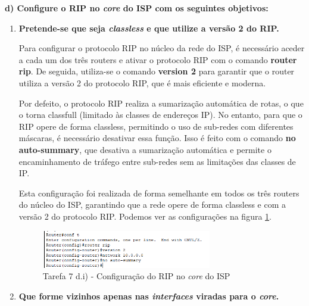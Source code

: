 \documentclass[11pt,english, openright, oneside]{book}
\begin{document}
\vspace{0.8cm}

\textbf{d) Configure o RIP no \textit{core} do ISP com os seguintes objetivos: }
\begin{enumerate}[label=\Roman*.]
    \item \textbf{Pretende-se que seja \textit{classless} e que utilize a versão 2 do RIP.}
    \vspace{0.2cm}

    Para configurar o protocolo RIP no núcleo da rede do ISP, é necessário aceder a cada um dos três routers e ativar o protocolo RIP com o comando \textbf{router rip}. De seguida, utiliza-se o comando \textbf{version 2} para garantir que o router utiliza a versão 2 do protocolo RIP, que é mais eficiente e moderna.

    \par Por defeito, o protocolo RIP realiza a sumarização automática de rotas, o que o torna classfull (limitado às classes de endereços IP). No entanto, para que o RIP opere de forma classless, permitindo o uso de sub-redes com diferentes máscaras, é necessário desativar essa função. Isso é feito com o comando \textbf{no auto-summary}, que desativa a sumarização automática e permite o encaminhamento de tráfego entre sub-redes sem as limitações das classes de IP.

    \par Esta configuração foi realizada de forma semelhante em todos os três routers do núcleo do ISP, garantindo que a rede opere de forma classless e com a versão 2 do protocolo RIP. Podemos ver as configurações na figura \ref{fig:7.d.i}.
    \vspace{0.2cm}

    \begin{figure}[H]
        \centering
        \includegraphics[width=0.7\textwidth]{imagens/Tarefa7/7.d_1.png}
        \caption{Tarefa 7 d.i) - Configuração do RIP no \textit{core} do ISP}
        \label{fig:7.d.i}
    \end{figure}
    

    \vspace{0.8cm}

    \item \textbf{Que forme vizinhos apenas nas \textit{interfaces} viradas para o \textit{core}.}
    \vspace{0.2cm}


\end{enumerate}
\end{document}
